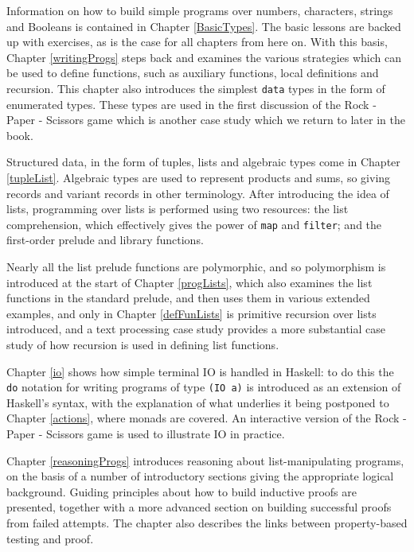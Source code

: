 Information on how to build simple programs over numbers, characters, strings and
Booleans is contained in Chapter \ref{BasicTypes}. The basic lessons are backed up with
exercises, as is the case for all chapters from here on. With this basis, Chapter \ref{writingProgs} 
steps back and examines the various strategies which can be used to
define functions, such as auxiliary functions, local definitions and recursion. This chapter also introduces the simplest \texttt{data} types in the form of enumerated types. These types are used in the first discussion of the Rock - Paper - Scissors game which is another case study which we return to later in the book.

Structured data, in the form of tuples, lists and algebraic types come in Chapter \ref{tupleList}. Algebraic types are used to represent products and sums, so giving records and variant records in other terminology.
After introducing the idea of lists, programming over lists is performed
using two resources: the list comprehension, which effectively gives the
power of \texttt{map} and \texttt{filter}; and the first-order prelude and library
functions. 

Nearly all the list prelude functions are polymorphic, and so
polymorphism is introduced at the start of Chapter \ref{progLists}, which also examines the list functions in the standard prelude, and then uses them in various extended
examples, and only in Chapter \ref{defFunLists} is primitive recursion over lists introduced, and a text
processing case study provides a more substantial case study of how recursion is used in defining list functions.

Chapter \ref{io} shows how simple terminal IO is handled in Haskell: to do this the \texttt{do} notation for writing programs of type \texttt{(IO a)} is introduced as an extension of Haskell's syntax, with the explanation of what underlies it being postponed to Chapter \ref{actions}, where monads are covered. An interactive version of the Rock - Paper - Scissors game is used to illustrate IO in practice.

Chapter \ref{reasoningProgs} introduces reasoning about list-manipulating programs, on the
basis of a number of introductory sections giving the appropriate logical background.
Guiding principles about how to build inductive proofs are presented,
together with a more advanced section on building successful proofs from
failed attempts. The chapter also describes the links between property-based testing and proof.

